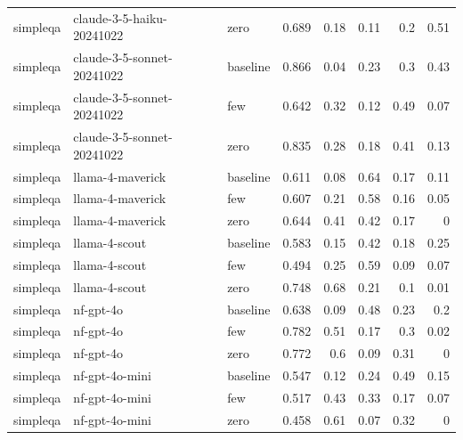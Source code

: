 \begin{table}[htbp]
\begin{tabular}{lllrrrrr}
simpleqa & claude-3-5-haiku-20241022 & zero & 0.689 & 0.18 & 0.11 & 0.2 & 0.51 \\
simpleqa & claude-3-5-sonnet-20241022 & baseline & 0.866 & 0.04 & 0.23 & 0.3 & 0.43 \\
simpleqa & claude-3-5-sonnet-20241022 & few & 0.642 & 0.32 & 0.12 & 0.49 & 0.07 \\
simpleqa & claude-3-5-sonnet-20241022 & zero & 0.835 & 0.28 & 0.18 & 0.41 & 0.13 \\
simpleqa & llama-4-maverick & baseline & 0.611 & 0.08 & 0.64 & 0.17 & 0.11 \\
simpleqa & llama-4-maverick & few & 0.607 & 0.21 & 0.58 & 0.16 & 0.05 \\
simpleqa & llama-4-maverick & zero & 0.644 & 0.41 & 0.42 & 0.17 & 0 \\
simpleqa & llama-4-scout & baseline & 0.583 & 0.15 & 0.42 & 0.18 & 0.25 \\
simpleqa & llama-4-scout & few & 0.494 & 0.25 & 0.59 & 0.09 & 0.07 \\
simpleqa & llama-4-scout & zero & 0.748 & 0.68 & 0.21 & 0.1 & 0.01 \\
simpleqa & nf-gpt-4o & baseline & 0.638 & 0.09 & 0.48 & 0.23 & 0.2 \\
simpleqa & nf-gpt-4o & few & 0.782 & 0.51 & 0.17 & 0.3 & 0.02 \\
simpleqa & nf-gpt-4o & zero & 0.772 & 0.6 & 0.09 & 0.31 & 0 \\
simpleqa & nf-gpt-4o-mini & baseline & 0.547 & 0.12 & 0.24 & 0.49 & 0.15 \\
simpleqa & nf-gpt-4o-mini & few & 0.517 & 0.43 & 0.33 & 0.17 & 0.07 \\
simpleqa & nf-gpt-4o-mini & zero & 0.458 & 0.61 & 0.07 & 0.32 & 0 \\
\bottomrule
\end{tabular}
\end{table}

